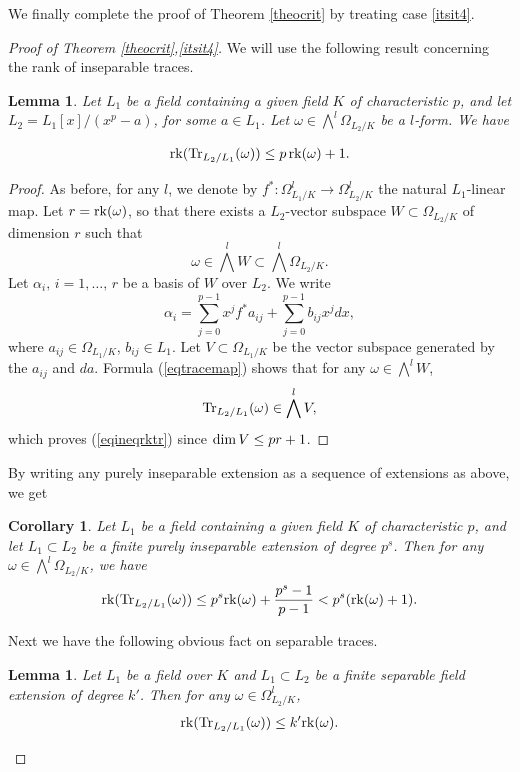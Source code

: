 \documentclass[10pt]{article}
\newtheorem{lemm}[theo]{Lemma}
\newtheorem{coro}[theo]{Corollary}
\begin{document}
We finally complete the proof of Theorem \ref{theocrit} by treating   case \ref{itsit4}.
\begin{proof}[Proof of Theorem \ref{theocrit},\ref{itsit4}] We will use  the following result concerning the rank of inseparable traces.
\begin{lemm}\label{letraceinsepnew} Let $ L_1$ be a field containing a given field  $K$ of characteristic $p$, and let  $L_2= L_1[x]/(x^p-a)$, for some $a\in L_1$.   Let  $\omega \in \bigwedge^l\Omega_{L_2/K}$ be a $l$-form. We have


 \begin{eqnarray}\label{eqineqrktr} {\rm rk}({\rm Tr}_{L_2/L_1}(\omega))\leq p\,{\rm rk}(\omega)+1.\end{eqnarray}
\end{lemm}
\begin{proof} As before, for any $l$, we denote by $f^*:\Omega_{L_{1}/K}^l\rightarrow \Omega_{L_{2}/K}^l$ the natural $L_1$-linear map.
Let $r={\rm rk}(\omega)$, so  that there exists a $L_2$-vector subspace $W\subset \Omega_{L_2/K}$ of dimension $ r$ such that
$$\omega\in \bigwedge^lW\subset \bigwedge^l\Omega_{L_2/K}.$$
Let $\alpha_i,\,i=1,\ldots,\,r$ be a basis of $W$ over $L_2$. We write
$$\alpha_i=\sum_{j=0}^{p-1}x^j f^*a_{ij}+\sum_{j=0}^{p-1} b_{ij}x^jdx,$$
where $a_{ij}\in \Omega_{L_1/K}$, $b_{ij}\in L_1$. Let $V\subset \Omega_{L_1/K}$ be the vector subspace generated by the $a_{ij}$ and $da$.  Formula (\ref{eqtracemap}) shows that for any
$\omega\in \bigwedge^lW$,
$${\rm Tr}_{L_2/L_1}(\omega)\in \bigwedge^lV,$$
which proves (\ref{eqineqrktr}) since ${\rm dim}\,V\leq pr+1$.
\end{proof}
By writing any purely inseparable extension as a sequence of extensions as above, we get
\begin{coro} \label{corotrace} Let $L_1$  be a field containing a given field  $K$ of characteristic $p$, and let
$L_1\subset L_2$ be a finite  purely inseparable extension of degree $p^s$. Then for any  $\omega\in\bigwedge^l\Omega_{L_2/K}$, we have
 \begin{eqnarray}\label{eqineqtracelnew} {\rm rk}({\rm Tr}_{L_2/L_1}(\omega))\leq p^s {\rm rk}(\omega)+\frac{p^{s}-1}{p-1}<p^s ({\rm rk}(\omega)+1).
\end{eqnarray}
\end{coro}
Next  we have  the following obvious fact on  separable traces.
\begin{lemm} \label{lepourrankseparnaiverank} Let $L_1$ be a field over $K$ and $L_1\subset L_2$ be a finite separable field extension of degree $k'$. Then  for any $\omega\in \Omega_{L_2/K}^l$,
\begin{eqnarray}\label{eqineqtracesep2711} {\rm rk}({\rm Tr}_{L_2/L_1}(\omega))\leq  k' {\rm rk}(\omega).\end{eqnarray}
\end{lemm}


\end{proof}
\end{document}
